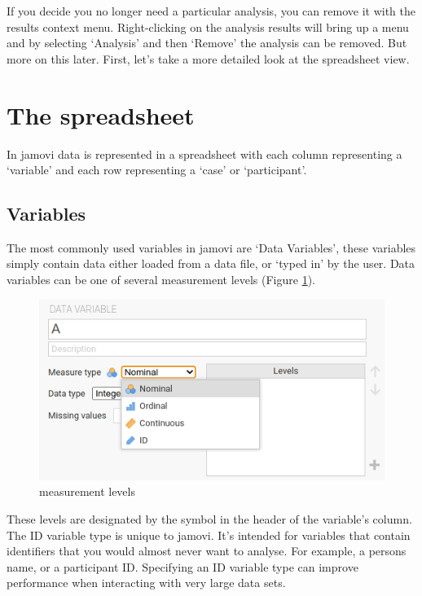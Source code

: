 \documentclass[
]{book}
\begin{document}
If you decide you no longer need a particular analysis, you can remove it with the results context menu. Right-clicking on the analysis results will bring up a menu and by selecting `Analysis' and then `Remove' the analysis can be removed. But more on this later. First, let's take a more detailed look at the spreadsheet view.

\hypertarget{the-spreadsheet}{%
\section{The spreadsheet}\label{the-spreadsheet}}

In jamovi data is represented in a spreadsheet with each column representing a `variable' and each row representing a `case' or `participant'.

\hypertarget{variables}{%
\subsection{Variables}\label{variables}}

The most commonly used variables in jamovi are `Data Variables', these variables simply contain data either loaded from a data file, or `typed in' by the user. Data variables can be one of several measurement levels (Figure \ref{fig:fig3-2}).

\begin{figure}
\includegraphics[width=0.9\linewidth]{images/Figure3} \caption{measurement levels}\label{fig:fig3-2}
\end{figure}

These levels are designated by the symbol in the header of the variable's column. The ID variable type is unique to jamovi. It's intended for variables that contain identifiers that you would almost never want to analyse. For example, a persons name, or a participant ID. Specifying an ID variable type can improve performance when interacting with very large data sets.
\end{document}
